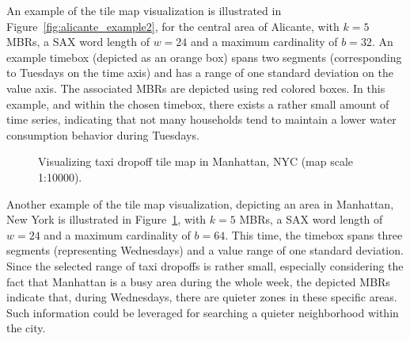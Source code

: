 An example of the tile map visualization is illustrated in Figure~\ref{fig:alicante_example2}, for the central area of Alicante, with $k=5$ MBRs, a SAX word length of $w=24$ and a maximum cardinality of $b=32$. An example timebox (depicted as an orange box) spans two \isax segments (corresponding to Tuesdays on the time axis) and has a range of one standard deviation on the value axis. The associated MBRs are depicted using red colored boxes. In this example, and within the chosen timebox, there exists a rather small amount of time series, indicating that not many households tend to maintain a lower water consumption behavior during Tuesdays.

\begin{figure}[!ht]
 \centering
 \caption{Visualizing taxi dropoff tile map in Manhattan, NYC (map scale 1:10000).}
 \label{fig:nyc_example2}
\end{figure}

Another example of the tile map visualization, depicting an area in Manhattan, New York is illustrated in Figure~\ref{fig:nyc_example2}, with $k=5$ MBRs, a SAX word length of $w=24$ and a maximum cardinality of $b=64$. This time, the timebox spans three \isax segments (representing Wednesdays) and a value range of one standard deviation. Since the selected range of taxi dropoffs is rather small, especially considering the fact that Manhattan is a busy area during the whole week, the depicted MBRs indicate that, during Wednesdays, there are quieter zones in these specific areas. Such information could be leveraged for searching a quieter neighborhood within the city.

